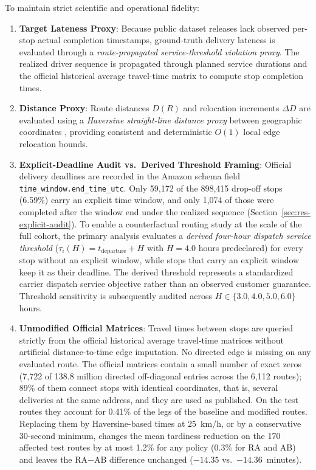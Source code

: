 \documentclass[11pt,a4paper]{article}
\begin{document}
To maintain strict scientific and operational fidelity:
\begin{enumerate}
    \item \textbf{Target Lateness Proxy}: Because public dataset releases lack observed per-stop actual completion timestamps, ground-truth delivery lateness is evaluated through a \emph{route-propagated service-threshold violation proxy}. The realized driver sequence is propagated through planned service durations and the official historical average travel-time matrix to compute stop completion times.
    \item \textbf{Distance Proxy}: Route distances $D(R)$ and relocation increments $\Delta D$ are evaluated using a \emph{Haversine straight-line distance proxy} between geographic coordinates \cite{sinnott1984}, providing consistent and deterministic $O(1)$ local edge relocation bounds.
    \item \textbf{Explicit-Deadline Audit vs.\ Derived Threshold Framing}: Official delivery deadlines are recorded in the Amazon schema field \texttt{time\_window.end\_time\_utc}. Only 59,172 of the 898,415 drop-off stops (6.59\%) carry an explicit time window, and only 1,074 of those were completed after the window end under the realized sequence (Section~\ref{sec:res-explicit-audit}). To enable a counterfactual routing study at the scale of the full cohort, the primary analysis evaluates a \emph{derived four-hour dispatch service threshold} ($\tau_i(H) = t_{\text{departure}} + H$ with $H=4.0$ hours predeclared) for every stop without an explicit window, while stops that carry an explicit window keep it as their deadline. The derived threshold represents a standardized carrier dispatch service objective rather than an observed customer guarantee. Threshold sensitivity is subsequently audited across $H \in \{3.0, 4.0, 5.0, 6.0\}$ hours.
    \item \textbf{Unmodified Official Matrices}: Travel times between stops are queried strictly from the official historical average travel-time matrices without artificial distance-to-time edge imputation. No directed edge is missing on any evaluated route. The official matrices contain a small number of exact zeros (7,722 of 138.8 million directed off-diagonal entries across the 6,112 routes); 89\% of them connect stops with identical coordinates, that is, several deliveries at the same address, and they are used as published. On the test routes they account for 0.41\% of the legs of the baseline and modified routes. Replacing them by Haversine-based times at 25~km/h, or by a conservative 30-second minimum, changes the mean tardiness reduction on the 170 affected test routes by at most 1.2\% for any policy (0.3\% for RA and AB) and leaves the RA$-$AB difference unchanged ($-14.35$ vs.\ $-14.36$~minutes).
\end{enumerate}
\end{document}
